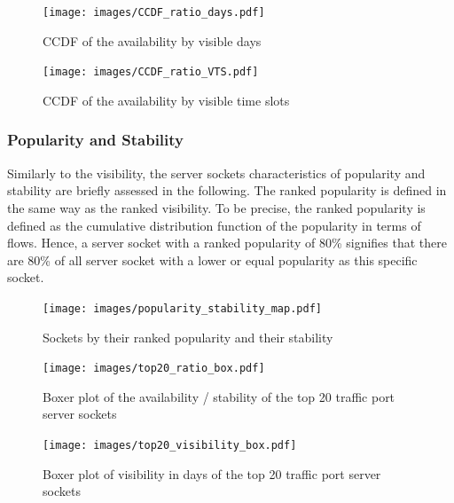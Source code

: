 \begin{landscape}
\begin{figure}
	[p] \centering 
	\texttt{[image: images/CCDF\_ratio\_days.pdf]}
	\caption{CCDF of the availability by visible days} 
	\label{fig:ccdf_ratio_days} 
\end{figure}
\end{landscape}

\begin{landscape}
\begin{figure}
	[p] \centering 
	\texttt{[image: images/CCDF\_ratio\_VTS.pdf]}
	\caption{CCDF of the availability by visible time slots} 
	\label{fig:ccdf_ratio_vts} 
\end{figure}
\end{landscape}

\subsubsection{Popularity and Stability}
Similarly to the visibility, the server sockets characteristics of popularity and stability are briefly assessed in the following. The ranked popularity is defined in the same way as the ranked visibility. To be precise, the ranked popularity is defined as the cumulative distribution function of the popularity in terms of flows. Hence, a server socket with a ranked popularity of 80\% signifies that there are 80\% of all server socket with a lower or equal popularity as this specific socket.


\begin{figure}
	[ht] \centering 
	\texttt{[image: images/popularity\_stability\_map.pdf]}
	\caption{Sockets by their ranked popularity and their stability} 
	\label{fig:rankedPopularity} 
\end{figure}


\begin{landscape}
\begin{figure}
	[hb] \centering 
	\texttt{[image: images/top20\_ratio\_box.pdf]}
	\caption{Boxer plot of the availability / stability of the top 20 traffic port server sockets} 
	\label{fig:top20_ratio_box} 
\end{figure}
\end{landscape}

\begin{landscape}
\begin{figure}
	[p] \centering 
	\texttt{[image: images/top20\_visibility\_box.pdf]}
	\caption{Boxer plot of visibility in days of the top 20 traffic port server sockets}
	\label{fig:top20_visibledays_box}
\end{figure}
\end{landscape}


